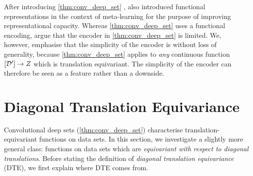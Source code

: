 \documentclass[12pt, twoside]{report}
\begin{document}
After introducing \cref{thm:conv_deep_set} \parencite{Gordon:2020:Convolutional_Conditional_Neural_Processes}, \textcite{Xu:2020:MetaFun_Meta-Learning_With_Iterative_Functional} also introduced functional representations in the context of meta-learning for the purpose of improving representational capacity.
Whereas \cref{thm:conv_deep_set} uses a functional encoding, \citeauthor{Xu:2020:MetaFun_Meta-Learning_With_Iterative_Functional} argue that the encoder in \cref{thm:conv_deep_set} is limited.
We, however, emphasise that the simplicity of the encoder is without loss of generality, because \cref{thm:conv_deep_set} applies to \emph{any} continuous function $[\mathcal{D}'] \to Z$ which is translation equivariant.
The simplicity of the encoder can therefore be seen as a feature rather than a downside.

\section{Diagonal Translation Equivariance}
\label{sec:repr_theorems:conv_deep_sets_dte}

Convolutional deep sets (\cref{thm:conv_deep_set}) characterise translation-equivariant functions on data sets.
In this section, we investigate a slightly more general class:
functions on data sets which are \emph{equivariant with respect to diagonal translations}.
Before stating the definition of \emph{diagonal translation equivariance} (DTE), we first explain where DTE comes from.
\end{document}

